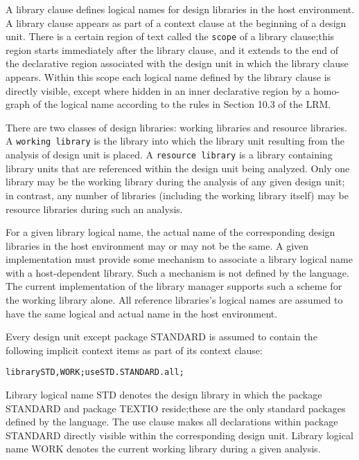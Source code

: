 \documentclass[11pt]{report}
\begin{document}
A library clause defines logical names for design libraries in the host
environment.  A library clause appears as part of a context clause at the
beginning of a design unit.  There is a certain region of text called the
\texttt{scope} of a library clause;this region starts immediately after
the library clause, and it extends to the end of the declarative region
associated with the design unit in which the library clause appears.
Within this scope each logical name defined by the library clause is
directly visible, except where hidden in an inner declarative region by a
homo-graph of the logical name according to the rules in Section 10.3 of
the LRM.

There are two classes of design libraries: working libraries and resource
libraries.  A \texttt{working library} is the library into which the
library unit resulting from the analysis of design unit is placed.  A
\texttt{resource library} is a library containing library units that are
referenced within the design unit being analyzed.  Only one library may be
the working library during the analysis of any given design unit; in
contrast, any number of libraries (including the working library itself)
may be resource libraries during such an analysis.

For a given library logical name, the actual name of the corresponding
design libraries in the host environment may or may not be the same.  A
given implementation must provide some mechanism to associate a library
logical name with a host-dependent library.  Such a mechanism is not
defined by the language.  The current implementation of the library
manager supports such a scheme for the working library alone.  All
reference libraries's logical names are assumed to have the same logical
and actual name in the host environment.

Every design unit except package STANDARD is assumed to contain the
following implicit context items as part of its context clause:

\begin{alltt}
        library STD, WORK; use STD.STANDARD.all;
\end{alltt}

Library logical name STD denotes the design library in which the package
STANDARD and package TEXTIO reside;these are the only standard packages
defined by the language.  The use clause makes all declarations within
package STANDARD directly visible within the corresponding design unit.
Library logical name WORK denotes the current working library during a
given analysis.
\end{document}
